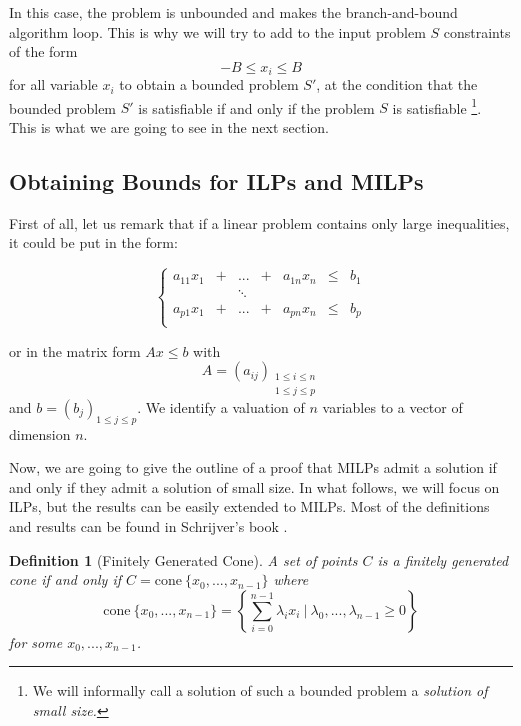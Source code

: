 \documentclass{article}
\newcommand{\cone}{\mathrm{cone}}
\newcommand{\ifff}{if and only if}
\newtheorem{definition}{Definition}
\begin{document}
In this case, the problem is unbounded and makes the branch-and-bound algorithm
loop. This is why we will try to add to the input problem $S$ constraints of
the form $$-B \leqslant x_i \leqslant B$$
for all variable $x_i$ to obtain a bounded problem $S'$, at the condition that
the bounded problem $S'$ is satisfiable if and only if the problem $S$
is satisfiable \footnote{We will informally call a solution of such a bounded
problem a \textit{solution of small size.}}. 
This is what we are going to see in the next section.

\subsection{Obtaining Bounds for ILPs and MILPs}
\label{schrijverbnd}
First of all, let us remark that if a linear problem contains only 
large inequalities, it could be put in the form:

\begin{displaymath}
  \left\{
  \begin{array}{ccccccl}
    a_{11} x_1 & + & ...    & + & a_{1n} x_n & \leqslant & b_1 \\
               &   & \ddots &   &            &           &     \\
    a_{p1} x_1 & + & ...    & + & a_{pn} x_n & \leqslant & b_p \\
  \end{array}
  \right.
\end{displaymath}

or in the matrix form $Ax \leqslant b$ with
$$A = (a_{ij})_{\substack{1 \leqslant i \leqslant n \\
                          1 \leqslant j \leqslant p}}$$ and
$b = (b_j)_{1 \leqslant j \leqslant p}$. We identify a valuation of $n$
variables to a vector of dimension $n$.

Now, we are going to give the outline of a proof that MILPs admit a solution
if and only if they admit a solution of small size. In what follows, we will
focus on ILPs, but the results can be easily extended to MILPs. Most of the
definitions and results can be found in Schrijver's book
\cite[Sections 7 and 16]{Schrijver1998}.

\begin{definition}[Finitely Generated Cone]
  A set of points $C$ is a \textsl{finitely generated cone}
  \ifff{} $C = \cone~\{x_0, ..., x_{n-1}\}$ where
  $$\cone~\{x_0, ..., x_{n-1}\} =
      \left\{\sum_{i=0}^{n-1} \lambda_i x_i~|~
               \lambda_0, ..., \lambda_{n-1} \geqslant 0\right\}
  $$
  for some $x_0, ..., x_{n-1}$.
\end{definition}
\end{document}
